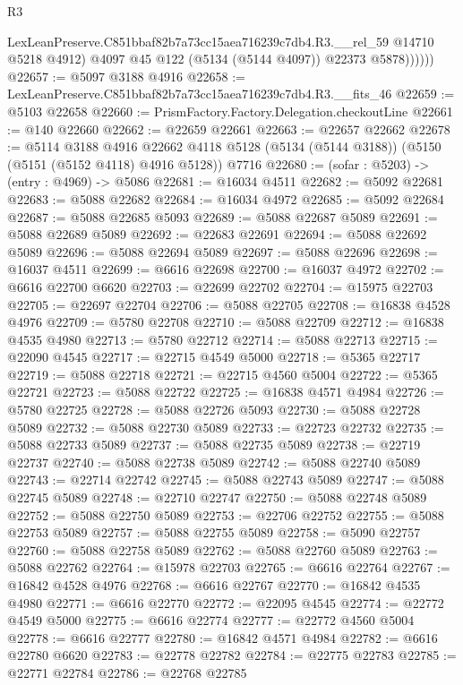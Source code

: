 \begin{lexlean}{R3}
\begin{coremodule}
                LexLeanPreserve.C851bbaf82b7a73cc15aea716239c7db4.R3.__rel_59 @14710 @5218 @4912)
                @4097
                @45
                @122
                (@5134 (@5144 @4097))
                @22373
                @5878))))))
@22657 := @5097 @3188 @4916
@22658 := LexLeanPreserve.C851bbaf82b7a73cc15aea716239c7db4.R3.__fits_46
@22659 := @5103 @22658
@22660 := PrismFactory.Factory.Delegation.checkoutLine
@22661 := @140 @22660
@22662 := @22659 @22661
@22663 := @22657 @22662
@22678 := @5114
    @3188
    @4916
    @22662
    @4118
    @5128
    (@5134 (@5144 @3188))
    (@5150 (@5151 (@5152 @4118) @4916 @5128))
    @7716
@22680 := (sofar : @5203) -> (entry : @4969) -> @5086
@22681 := @16034 @4511
@22682 := @5092 @22681
@22683 := @5088 @22682
@22684 := @16034 @4972
@22685 := @5092 @22684
@22687 := @5088 @22685 @5093
@22689 := @5088 @22687 @5089
@22691 := @5088 @22689 @5089
@22692 := @22683 @22691
@22694 := @5088 @22692 @5089
@22696 := @5088 @22694 @5089
@22697 := @5088 @22696
@22698 := @16037 @4511
@22699 := @6616 @22698
@22700 := @16037 @4972
@22702 := @6616 @22700 @6620
@22703 := @22699 @22702
@22704 := @15975 @22703
@22705 := @22697 @22704
@22706 := @5088 @22705
@22708 := @16838 @4528 @4976
@22709 := @5780 @22708
@22710 := @5088 @22709
@22712 := @16838 @4535 @4980
@22713 := @5780 @22712
@22714 := @5088 @22713
@22715 := @22090 @4545
@22717 := @22715 @4549 @5000
@22718 := @5365 @22717
@22719 := @5088 @22718
@22721 := @22715 @4560 @5004
@22722 := @5365 @22721
@22723 := @5088 @22722
@22725 := @16838 @4571 @4984
@22726 := @5780 @22725
@22728 := @5088 @22726 @5093
@22730 := @5088 @22728 @5089
@22732 := @5088 @22730 @5089
@22733 := @22723 @22732
@22735 := @5088 @22733 @5089
@22737 := @5088 @22735 @5089
@22738 := @22719 @22737
@22740 := @5088 @22738 @5089
@22742 := @5088 @22740 @5089
@22743 := @22714 @22742
@22745 := @5088 @22743 @5089
@22747 := @5088 @22745 @5089
@22748 := @22710 @22747
@22750 := @5088 @22748 @5089
@22752 := @5088 @22750 @5089
@22753 := @22706 @22752
@22755 := @5088 @22753 @5089
@22757 := @5088 @22755 @5089
@22758 := @5090 @22757
@22760 := @5088 @22758 @5089
@22762 := @5088 @22760 @5089
@22763 := @5088 @22762
@22764 := @15978 @22703
@22765 := @6616 @22764
@22767 := @16842 @4528 @4976
@22768 := @6616 @22767
@22770 := @16842 @4535 @4980
@22771 := @6616 @22770
@22772 := @22095 @4545
@22774 := @22772 @4549 @5000
@22775 := @6616 @22774
@22777 := @22772 @4560 @5004
@22778 := @6616 @22777
@22780 := @16842 @4571 @4984
@22782 := @6616 @22780 @6620
@22783 := @22778 @22782
@22784 := @22775 @22783
@22785 := @22771 @22784
@22786 := @22768 @22785

\end{coremodule}
\end{lexlean}
